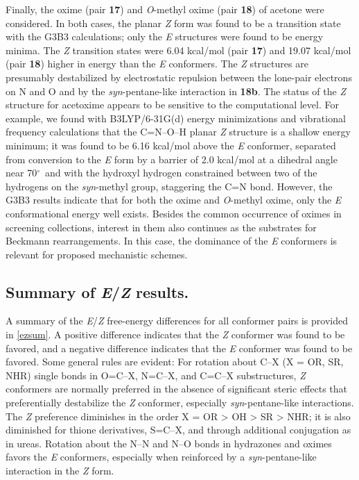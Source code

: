 \documentclass[12pt]{report}
\def\deg{$^{\circ}$}
\begin{document}
Finally, the oxime (pair \textbf{17}) and \textit{O}-methyl oxime (pair \textbf{18}) of acetone were considered. In both cases, the planar \textit{Z} form was found to be a transition state with the G3B3 calculations; only the \textit{E} structures were found to be energy minima. The \textit{Z} transition states were 6.04 kcal/mol (pair \textbf{17}) and 19.07 kcal/mol (pair \textbf{18}) higher in energy than the \textit{E} conformers. The \textit{Z} structures are presumably destabilized by electrostatic repulsion between the lone-pair electrons on N and O and by the \textit{syn}-pentane-like interaction in \textbf{18b}. The status of the \textit{Z} structure for acetoxime appears to be sensitive to the computational level. For example, we found with B3LYP/6-31G(d) energy minimizations and vibrational frequency calculations that the C=N--O--H planar \textit{Z} structure is a shallow energy minimum; it was found to be 6.16 kcal/mol above the \textit{E} conformer, separated from conversion to the \textit{E} form by a barrier of 2.0 kcal/mol at a dihedral angle near 70\deg\ and with the hydroxyl hydrogen constrained between two of the hydrogens on the \textit{syn}-methyl group, staggering the C=N bond. However, the G3B3 results indicate that for both the oxime and \textit{O}-methyl oxime, only the \textit{E} conformational energy well exists. Besides the common occurrence of oximes in screening collections, interest in them also continues as the substrates for Beckmann rearrangements. In this case, the dominance of the \textit{E} conformers is relevant for proposed mechanistic schemes.\cite{yam}


\subsection{Summary of \textit{E}/\textit{Z} results.}

A summary of the \textit{E}/\textit{Z} free-energy differences for all conformer pairs is provided in \cref{ezsum}. A positive difference indicates that the \textit{Z} conformer was found to be favored, and a negative difference indicates that the \textit{E} conformer was found to be favored. Some general rules are evident: For rotation about C--X (X = OR, SR, NHR) single bonds in O=C--X, N=C--X, and C=C--X substructures, \textit{Z} conformers are normally preferred in the absence of significant steric effects that preferentially destabilize the \textit{Z} conformer, especially \textit{syn}-pentane-like interactions. The \textit{Z} preference diminishes in the order X = OR > OH > SR > NHR; it is also diminished for thione derivatives, S=C--X, and through additional conjugation as in ureas. Rotation about the N--N and N--O bonds in hydrazones and oximes favors the \textit{E} conformers, especially when reinforced by a \textit{syn}-pentane-like interaction in the \textit{Z} form.
\end{document}
